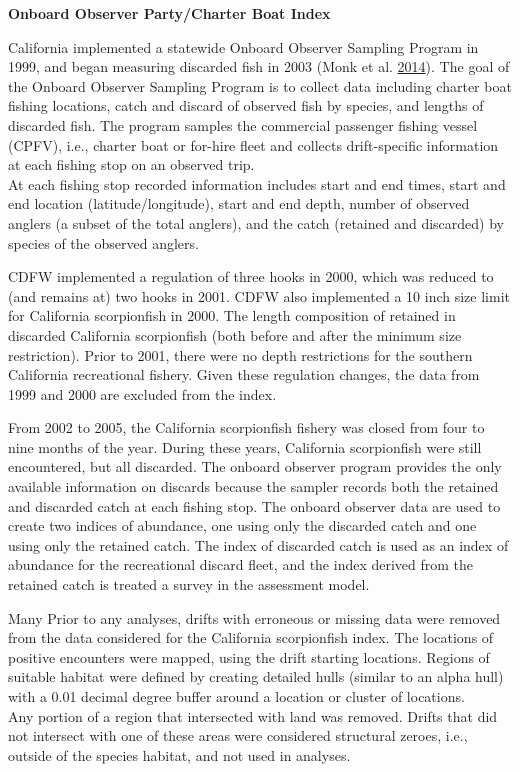 \documentclass[12pt,]{article}
\begin{document}
\textbf{Onboard Observer Party/Charter Boat Index}

California implemented a statewide Onboard Observer Sampling Program in
1999, and began measuring discarded fish in 2003 (Monk et al.
\protect\hyperlink{ref-Monk2014}{2014}). The goal of the Onboard
Observer Sampling Program is to collect data including charter boat
fishing locations, catch and discard of observed fish by species, and
lengths of discarded fish. The program samples the commercial passenger
fishing vessel (CPFV), i.e., charter boat or for-hire fleet and collects
drift-specific information at each fishing stop on an observed trip.\\
At each fishing stop recorded information includes start and end times,
start and end location (latitude/longitude), start and end depth, number
of observed anglers (a subset of the total anglers), and the catch
(retained and discarded) by species of the observed anglers.

CDFW implemented a regulation of three hooks in 2000, which was reduced
to (and remains at) two hooks in 2001. CDFW also implemented a 10 inch
size limit for California scorpionfish in 2000. The length composition
of retained in discarded California scorpionfish (both before and after
the minimum size restriction). Prior to 2001, there were no depth
restrictions for the southern California recreational fishery. Given
these regulation changes, the data from 1999 and 2000 are excluded from
the index.

From 2002 to 2005, the California scorpionfish fishery was closed from
four to nine months of the year. During these years, California
scorpionfish were still encountered, but all discarded. The onboard
observer program provides the only available information on discards
because the sampler records both the retained and discarded catch at
each fishing stop. The onboard observer data are used to create two
indices of abundance, one using only the discarded catch and one using
only the retained catch. The index of discarded catch is used as an
index of abundance for the recreational discard fleet, and the index
derived from the retained catch is treated a survey in the assessment
model.

Many Prior to any analyses, drifts with erroneous or missing data were
removed from the data considered for the California scorpionfish index.
The locations of positive encounters were mapped, using the drift
starting locations. Regions of suitable habitat were defined by creating
detailed hulls (similar to an alpha hull) with a 0.01 decimal degree
buffer around a location or cluster of locations.\\
Any portion of a region that intersected with land was removed. Drifts
that did not intersect with one of these areas were considered
structural zeroes, i.e., outside of the species habitat, and not used in
analyses.
\end{document}
